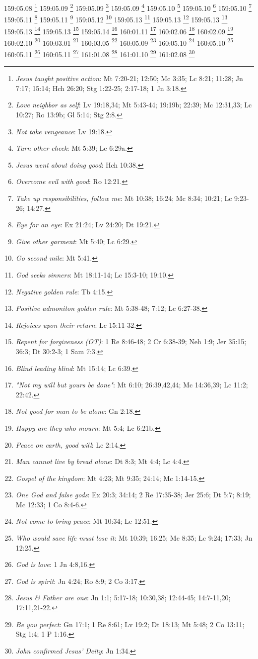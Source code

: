 {{{{{{{{{{{{{{{{{{{{{{{{{{{{{{{{{{{{159:05.08 \footnote{\textit{Jesus taught positive action}: Mt 7:20-21; 12:50; Mc 3:35; Lc 8:21; 11:28; Jn 7:17; 15:14; Hch 26:20; Stg 1:22-25; 2:17-18; 1 Jn 3:18.}
159:05.09 \footnote{\textit{Love neighbor as self}: Lv 19:18,34; Mt 5:43-44; 19:19b; 22:39; Mc 12:31,33; Lc 10:27; Ro 13:9b; Gl 5:14; Stg 2:8.}
159:05.09 \footnote{\textit{Not take vengeance}: Lv 19:18.}
159:05.09 \footnote{\textit{Turn other cheek}: Mt 5:39; Lc 6:29a.}
159:05.10 \footnote{\textit{Jesus went about doing good}: Hch 10:38.}
159:05.10 \footnote{\textit{Overcome evil with good}: Ro 12:21.}
159:05.10 \footnote{\textit{Take up responsibilities, follow me}: Mt 10:38; 16:24; Mc 8:34; 10:21; Lc 9:23-26; 14:27.}
159:05.11 \footnote{\textit{Eye for an eye}: Ex 21:24; Lv 24:20; Dt 19:21.}
159:05.11 \footnote{\textit{Give other garment}: Mt 5:40; Lc 6:29.}
159:05.12 \footnote{\textit{Go second mile}: Mt 5:41.}
159:05.13 \footnote{\textit{God seeks sinners}: Mt 18:11-14; Lc 15:3-10; 19:10.}
159:05.13 \footnote{\textit{Negative golden rule}: Tb 4:15.}
159:05.13 \footnote{\textit{Positive admoniton golden rule}: Mt 5:38-48; 7:12; Lc 6:27-38.}
159:05.13 \footnote{\textit{Rejoices upon their return}: Lc 15:11-32.}
159:05.13 \footnote{\textit{Repent for forgiveness (OT)}: 1 Re 8:46-48; 2 Cr 6:38-39; Neh 1:9; Jer 35:15; 36:3; Dt 30:2-3; 1 Sam 7:3.}
159:05.14 \footnote{\textit{Blind leading blind}: Mt 15:14; Lc 6:39.}
160:01.11 \footnote{\textit{"Not my will but yours be done"}: Mt 6:10; 26:39,42,44; Mc 14:36,39; Lc 11:2; 22:42.}
160:02.06 \footnote{\textit{Not good for man to be alone}: Gn 2:18.}
160:02.09 \footnote{\textit{Happy are they who mourn}: Mt 5:4; Lc 6:21b.}
160:02.10 \footnote{\textit{Peace on earth, good will}: Lc 2:14.}
160:03.01 \footnote{\textit{Man cannot live by bread alone}: Dt 8:3; Mt 4:4; Lc 4:4.}
160:03.05 \footnote{\textit{Gospel of the kingdom}: Mt 4:23; Mt 9:35; 24:14; Mc 1:14-15.}
160:05.09 \footnote{\textit{One God and false gods}: Ex 20:3; 34:14; 2 Re 17:35-38; Jer 25:6; Dt 5:7; 8:19; Mc 12:33; 1 Co 8:4-6.}
160:05.10 \footnote{\textit{Not come to bring peace}: Mt 10:34; Lc 12:51.}
160:05.10 \footnote{\textit{Who would save life must lose it}: Mt 10:39; 16:25; Mc 8:35; Lc 9:24; 17:33; Jn 12:25.}
160:05.11 \footnote{\textit{God is love}: 1 Jn 4:8,16.}
160:05.11 \footnote{\textit{God is spirit}: Jn 4:24; Ro 8:9; 2 Co 3:17.}
161:01.08 \footnote{\textit{Jesus & Father are one}: Jn 1:1; 5:17-18; 10:30,38; 12:44-45; 14:7-11,20; 17:11,21-22.}
161:01.10 \footnote{\textit{Be you perfect}: Gn 17:1; 1 Re 8:61; Lv 19:2; Dt 18:13; Mt 5:48; 2 Co 13:11; Stg 1:4; 1 P 1:16.}
161:02.08 \footnote{\textit{John confirmed Jesus' Deity}: Jn 1:34.}
}}}}}}}}}}}}}}}}}}}}}}}}}}}}}}}}}}}}

